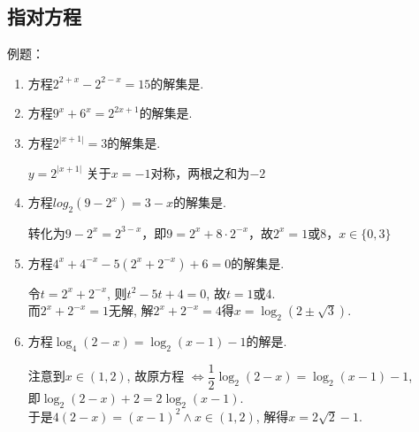 \subsection*{指对方程}
例题：
\begin{enumerate}
    \item 方程$2^{2+x}-2^{2-x}=15$的解集是. 
    \item 方程$9^x+6^x=2^{2x+1}$的解集是. 
    \item 方程$2^{\left| {x+1} \right|}=3$的解集是.
    \begin{jieda}
    $y = 2^{\left| {x+1} \right|}$ 关于$x = -1$对称，两根之和为$-2$
    \end{jieda}
    \item 方程$log_2(9-2^x) = 3-x$的解集是.
    \begin{jieda}
        转化为$9-2^x = 2^{3-x}$，即$9 = 2^x + 8 \cdot 2^{-x}$，故$2^x = 1$或$8$，$x \in \{0, 3\}$
    \end{jieda}
    \item 方程$4^x+4^{-x}-5(2^x+2^{-x})+6=0$的解集是.
    \begin{jieda}
    令$t=2^x+2^{-x}$, 则$t^2-5t+4=0$, 故$t=1$或4. \\
    而$2^x+2^{-x}=1$无解, 解$2^x+2^{-x}=4$得$x=\log_2(2\pm\sqrt{3})$. 
    \end{jieda}
    \item 方程$\log_4(2-x)=\log_2(x-1)-1$的解是. 
    \begin{jieda}
    注意到$x\in(1,2)$, 故原方程
    $\iff\dfrac{1}{2}\log_2(2-x)=\log_2(x-1)-1$, \\
    即$\log_2(2-x)+2=2\log_2(x-1)$. \\
    于是$4(2-x)=(x-1)^2\land x\in(1,2)$, 解得$x=2\sqrt{2}-1$. 
    \end{jieda}
    

\end{enumerate}
